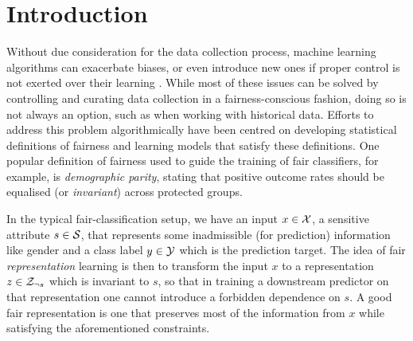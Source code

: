 \section{Introduction}
Without due consideration for the data collection process, machine learning algorithms can
exacerbate biases, or even introduce new ones if proper control is not exerted over their learning
\citep{holstein2019improving}. 
%
While most of these issues can be solved by controlling and curating data collection in a
fairness-conscious fashion, doing so is not always an option, such as when working with historical
data. 
%
Efforts to address this problem algorithmically have been centred on developing statistical
definitions of fairness and learning models that satisfy these definitions. 
%
One popular definition of fairness used to guide the training of fair classifiers, for example, is
\emph{demographic parity}, stating that positive outcome rates should be equalised (or
\emph{invariant}) across protected groups.

In the typical fair-classification setup, we have an input $x \in {\mathcal{X}}$, a sensitive attribute $s
\in {\mathcal{S}}$, that represents some inadmissible (for prediction) information like gender and a class
label $y \in {\mathcal{Y}}$ which is the prediction target. 
%
The idea of fair \emph{representation} learning
\citep{zemel2013learning,edwards2016censoring,madras2018learning} is then to transform the input
$x$ to a representation $z \in {\mathcal{Z}}_{\neg s}$ which is invariant to $s$, so that in training a
downstream predictor on that representation one cannot introduce a forbidden dependence on $s$.
A good fair representation is one that preserves most of the information from $x$ while
satisfying the aforementioned constraints.

